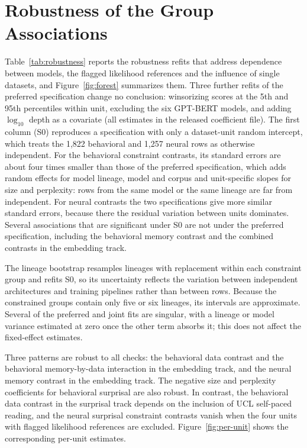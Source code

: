 \section{Robustness of the Group Associations}
\label{app:robustness}

Table~\ref{tab:robustness} reports the robustness refits that address dependence between models, the flagged likelihood references and the influence of single datasets, and Figure~\ref{fig:forest} summarizes them. Three further refits of the preferred specification change no conclusion: winsorizing scores at the 5th and 95th percentiles within unit, excluding the six GPT-BERT models, and adding $\log_{10}$ depth as a covariate (all estimates in the released coefficient file). The first column (S0) reproduces a specification with only a dataset-unit random intercept, which treats the 1,822 behavioral and 1,257 neural rows as otherwise independent. For the behavioral constraint contrasts, its standard errors are about four times smaller than those of the preferred specification, which adds random effects for model lineage, model and corpus and unit-specific slopes for size and perplexity: rows from the same model or the same lineage are far from independent. For neural contrasts the two specifications give more similar standard errors, because there the residual variation between units dominates. Several associations that are significant under S0 are not under the preferred specification, including the behavioral memory contrast and the combined contrasts in the embedding track.

The lineage bootstrap resamples lineages with replacement within each constraint group and refits S0, so its uncertainty reflects the variation between independent architectures and training pipelines rather than between rows. Because the constrained groups contain only five or six lineages, its intervals are approximate. Several of the preferred and joint fits are singular, with a lineage or model variance estimated at zero once the other term absorbs it; this does not affect the fixed-effect estimates.

Three patterns are robust to all checks: the behavioral data contrast and the behavioral memory-by-data interaction in the embedding track, and the neural memory contrast in the embedding track. The negative size and perplexity coefficients for behavioral surprisal are also robust. In contrast, the behavioral data contrast in the surprisal track depends on the inclusion of UCL self-paced reading, and the neural surprisal constraint contrasts vanish when the four units with flagged likelihood references are excluded. Figure~\ref{fig:per-unit} shows the corresponding per-unit estimates.

